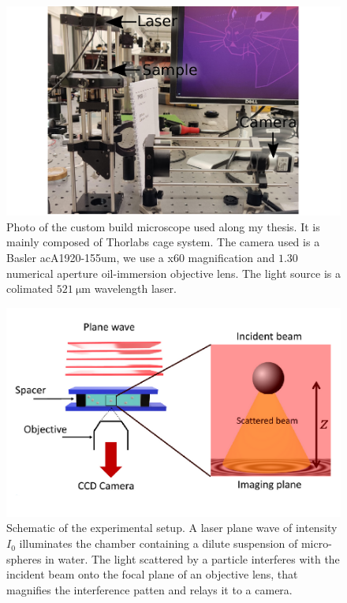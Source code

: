\begin{figure}[!ht]
	\centering
	\includegraphics{02_body/chapter2/images/figures_setup/photo_setup.pdf}
	\caption{Photo of the custom build microscope used along my thesis. It is mainly composed of Thorlabs cage system. The camera used is a Basler acA1920-155um, we use a x60 magnification and $1.30$ numerical aperture oil-immersion objective lens. The light source is a colimated  $521 ~ \mathrm{\mu m}$ wavelength laser.}
	\label{fig:picture}
\end{figure}

\begin{figure}[!ht]
	\centering
	\includegraphics[scale=0.9]{02_body/chapter2/images/figures_setup/schema_setup.pdf}
	\caption{Schematic of the experimental setup. A laser plane wave of intensity $I_0$ illuminates the chamber containing a dilute suspension of micro-spheres in water. The light scattered by a particle interferes with the incident beam onto the focal plane of an objective lens, that magnifies the interference patten and relays it to a camera.}
	\label{fig:schema}
\end{figure}


